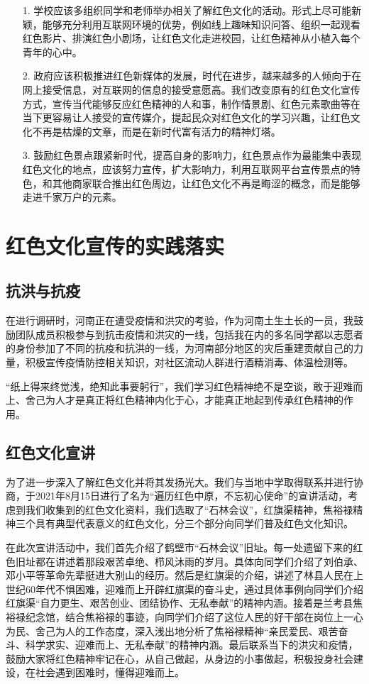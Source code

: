 \documentclass[AutoFakeBold]{LZUThesis}
\begin{document}
\begin{enumerate}
    \item[1.]学校应该多组织同学和老师举办相关了解红色文化的活动。形式上尽可能新颖，能够充分利用互联网环境的优势，例如线上趣味知识问答、组织一起观看红色影片、排演红色小剧场，让红色文化走进校园，让红色精神从小植入每个青年的心中。
    \item[2.]政府应该积极推进红色新媒体的发展，时代在进步，越来越多的人倾向于在网上接受信息，对互联网的信息的接受意愿高。我们改变原有的红色文化宣传方式，宣传当代能够反应红色精神的人和事，制作情景剧、红色元素歌曲等在当下更容易让人接受的宣传媒介，提起民众对红色文化的学习兴趣，让红色文化不再是枯燥的文章，而是在新时代富有活力的精神灯塔。
    \item[3.]鼓励红色景点跟紧新时代，提高自身的影响力，红色景点作为最能集中表现红色文化的地点，应该努力宣传，扩大影响力，利用互联网平台宣传景点的特色，和其他商家联合推出红色周边，让红色文化不再是晦涩的概念，而是能够走进千家万户的元素。
\end{enumerate}

\chapter{红色文化宣传的实践落实}
\section{抗洪与抗疫}
在进行调研时，河南正在遭受疫情和洪灾的考验，作为河南土生土长的一员，我鼓励团队成员积极参与到抗击疫情和洪灾的一线，包括我在内的多名同学都以志愿者的身份参加了不同的抗疫和抗洪的一线，为河南部分地区的灾后重建贡献自己的力量，积极宣传疫情防控相关知识，对社区流动人群进行酒精消毒、体温检测等。

“纸上得来终觉浅，绝知此事要躬行”，我们学习红色精神绝不是空谈，敢于迎难而上、舍己为人才是真正将红色精神内化于心，才能真正地起到传承红色精神的作用。


\section{红色文化宣讲}
为了进一步深入了解红色文化并将其发扬光大。我们与当地中学取得联系并进行协商，于2021年8月15日进行了名为“遍历红色中原，不忘初心使命”的宣讲活动，考虑到我们收集到的红色文化资料，我们选取了“石林会议”，红旗渠精神，焦裕禄精神三个具有典型代表意义的红色文化，分三个部分向同学们普及红色文化知识。

在此次宣讲活动中，我们首先介绍了鹤壁市“石林会议”旧址。每一处遗留下来的红色旧址都在讲述着那段艰苦卓绝、栉风沐雨的岁月。具体向同学们介绍了刘伯承、邓小平等革命先辈挺进大别山的经历。然后是红旗渠的介绍，讲述了林县人民在上世纪60年代不惧困难，迎难而上开辟红旗渠的奋斗史，通过具体事例向同学们介绍红旗渠“自力更生、艰苦创业、团结协作、无私奉献”的精神内涵。接着是兰考县焦裕禄纪念馆，结合焦裕禄的事迹，向同学们介绍了这位人民的好干部在岗位上一心为民、舍己为人的工作态度，深入浅出地分析了焦裕禄精神“亲民爱民、艰苦奋斗、科学求实、迎难而上、无私奉献”的精神内涵。最后联系当下的洪灾和疫情，鼓励大家将红色精神牢记在心，从自己做起，从身边的小事做起，积极投身社会建设，在社会遇到困难时，懂得迎难而上。
\end{document}
